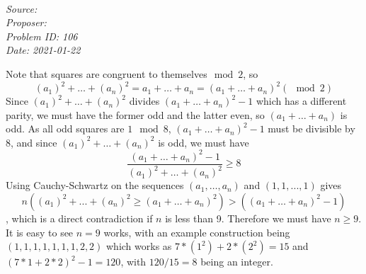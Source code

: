 \SSbreak\\
\emph{Source: \Cop}\\
\emph{Proposer: \Pchris}\\
\emph{Problem ID: 106}\\
\emph{Date: 2021-01-22}\\
\SSbreak

\bigskip

\begin{solution}\hfil\medskip

    Note that squares are congruent to themselves\(\mod 2\), so \[(a_1)^2 + \ldots + (a_n)^2 = a_1 +\ldots + a_n = (a_1 + \ldots + a_n)^2(\mod 2)\] Since \((a_1)^2 + \ldots + (a_n)^2\) divides \((a_1 +\ldots + a_n)^2 - 1\) which has a different parity, we must have the former odd and the latter even, so \((a_1 + \ldots + a_n)\) is odd. As all odd squares are \(1\mod 8\), \((a_1 +\ldots+ a_n)^2 - 1\) must be divisible by 8, and since \((a_1)^2 + \ldots+ (a_n)^2 \) is odd, we must have 
    \begin{equation*}
    \frac{(a_1 + \ldots + a_n)^2 - 1}{(a_1)^2 + \ldots + (a_n)^2} \geq 8
\end{equation*}
    Using Cauchy-Schwartz on the sequences \((a_1, \ldots, a_n)\) and \((1, 1, ..., 1)\) gives \[n((a_1)^2 + ... + (a_n)^2 \geq (a_1 + \ldots+ a_n)^2) > ((a_1 +\ldots + a_n)^2 - 1)\], which is a direct contradiction if \(n\) is less than 9. Therefore we must have \(n \geq 9\). It is easy to see \(n = 9\) works, with an example construction being \((1, 1, 1, 1, 1, 1, 1, 2, 2)\) which works as \(7*(1^2) + 2*(2^2) = 15\) and \((7*1 + 2*2)^2 - 1 = 120\), with \(120/15 = 8\) being an integer.\\

\end{solution}\bigskip
